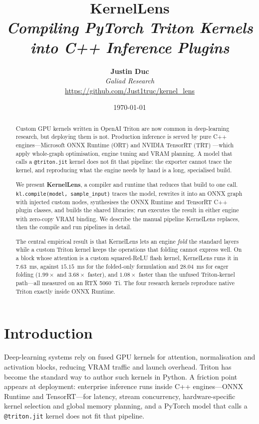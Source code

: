 \documentclass[11pt,a4paper]{article}
\title{\Huge \textbf{KernelLens} \\[0.4em]
\large \textit{Compiling PyTorch Triton Kernels into C++ Inference Plugins}}
\author{
    \textbf{Justin Duc} \\
    \textit{Galiad Research} \\
    \url{https://github.com/Just1truc/kernel_lens}
}
\date{\today}
\begin{document}
\maketitle

\begin{abstract}
Custom GPU kernels written in OpenAI Triton \cite{triton2019} are now common in
deep-learning research, but deploying them is not. Production inference is
served by pure C++ engines---Microsoft ONNX Runtime (ORT) \cite{onnxruntime} and
NVIDIA TensorRT (TRT) \cite{tensorrt}---which apply whole-graph optimisation,
engine tuning and VRAM planning. A model that calls a \texttt{@triton.jit}
kernel does not fit that pipeline: the exporter cannot trace the kernel, and
reproducing what the engine needs by hand is a long, specialised build.

We present \textbf{KernelLens}, a compiler and runtime that reduces that build to
one call. \texttt{kl.compile(model, sample\_input)} traces the model, rewrites it
into an ONNX graph with injected custom nodes, synthesises the ONNX Runtime and
TensorRT C++ plugin classes, and builds the shared libraries; \texttt{run}
executes the result in either engine with zero-copy VRAM binding. We describe
the manual pipeline KernelLens replaces, then the compile and run pipelines in
detail.

The central empirical result is that KernelLens lets an engine \emph{fold} the
standard layers while a custom Triton kernel keeps the operations that folding
cannot express well. On a block whose attention is a custom squared-ReLU flash
kernel, KernelLens runs it in $7.63$~ms, against $15.15$~ms for the folded-only
formulation and $28.04$~ms for eager folding ($1.99\times$ and $3.68\times$
faster), and $1.08\times$ faster than the unfused Triton-kernel path---all
measured on an RTX 5060~Ti. The four research kernels reproduce native Triton
exactly inside ONNX Runtime.
\end{abstract}

\tableofcontents
\newpage

\section{Introduction}

Deep-learning systems rely on fused GPU kernels for attention, normalisation and
activation blocks, reducing VRAM traffic and launch overhead. Triton has become
the standard way to author such kernels in Python. A friction point appears at
deployment: enterprise inference runs inside C++ engines---ONNX Runtime and
TensorRT---for latency, stream concurrency, hardware-specific kernel selection
and global memory planning, and a PyTorch model that calls a
\texttt{@triton.jit} kernel does not fit that pipeline.
\end{document}
